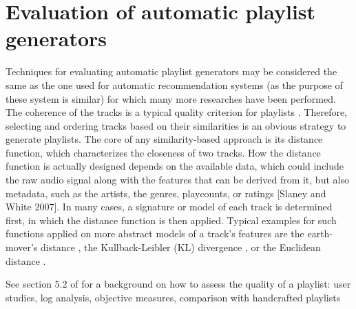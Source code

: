 \section{Evaluation of automatic playlist generators}
Techniques for evaluating automatic playlist generators may be considered the same as the one used for automatic recommendation systems (as the purpose of these system is similar) for which many more researches have been performed. 
The coherence of the tracks is a typical quality criterion for playlists \cite{logan04}. 
Therefore, selecting and ordering tracks based on their similarities is an obvious strategy to generate playlists. The core of any similarity-based approach is its distance function, which characterizes the closeness of two tracks. How the distance function is actually designed depends on the available data, which could include the raw audio signal along with the features that can be derived from it, but also metadata, such as the artists, the genres, playcounts, or ratings [Slaney and White 2007]. In many cases, a signature or model of each track is determined first, in which the distance function is then applied. Typical examples for such functions applied on more abstract models of a track’s features are the earth-mover’s distance \cite{logan04}, the Kullback-Leibler (KL) divergence \cite{vignoli05}, or the Euclidean distance \cite{knees06}.

See section 5.2 of \cite{bonnin14} for a background on how to assess the quality of a playlist: user studies, log analysis, objective measures, comparison with handcrafted playlists

